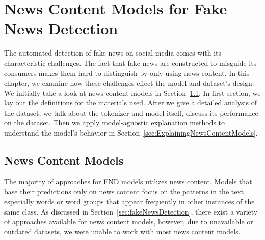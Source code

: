 
\chapter{News Content Models for Fake News Detection}\label{chapter:NewsContentModelsForFND}
The automated detection of fake news on social media comes with its characteristic challenges. The fact
that fake news are constructed to misguide its consumers makes them hard to distinguish by only using news content.
In this chapter, we examine how these challenges effect the model and dataset's design. We initially take a look at news content models in Section~\ref{sec:newsContentModels}. In first section, we lay out the definitions for the materials used. After we give a detailed analysis of the dataset, we talk about the tokenizer and model itself, discuss its performance on the dataset. Then we apply model-agnostic explanation methods to understand the model's behavior in Section~\ref{sec:ExplainingNewsContentModels}.

\section{News Content Models}
\label{sec:newsContentModels}
The majority of approaches for FND models utilizes news content. Models that base their predictions only on news content focus on the patterns in the text, especially words or word groups that appear frequently in other instances of the same class. As discussed in Section~\ref{sec:fakeNewsDetection}, there exist a variety of approaches available for news content models, however, due to unavailable or outdated datasets, we were unable to work with most news content models.

